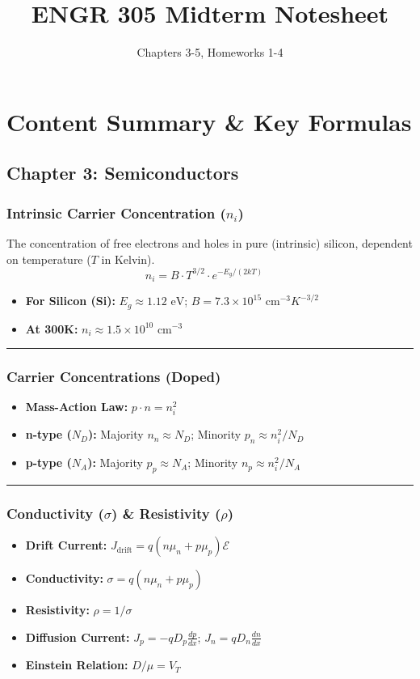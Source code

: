 \documentclass[10pt, letterpaper]{article}
\title{ENGR 305 Midterm Notesheet}
\author{Chapters 3-5, Homeworks 1-4}
\date{}
\begin{document}
\maketitle
\pagestyle{empty} %


\section*{Content Summary \& Key Formulas}

\subsection*{Chapter 3: Semiconductors}

\subsubsection*{Intrinsic Carrier Concentration ($n_i$)}
The concentration of free electrons and holes in pure (intrinsic) silicon, dependent on temperature ($T$ in Kelvin).
\[ n_i = B \cdot T^{3/2} \cdot e^{-E_g / (2 k T)} \quad \text{} \]
\begin{itemize}
    \item \textbf{For Silicon (Si):} $E_g \approx 1.12 \text{ eV}$; $B = 7.3 \times 10^{15} \text{ cm}^{-3}K^{-3/2}$
    \item \textbf{At 300K:} $n_i \approx 1.5 \times 10^{10} \text{ cm}^{-3}$
\end{itemize}

\hrule

\subsubsection*{Carrier Concentrations (Doped)}
\begin{itemize}
    \item \textbf{Mass-Action Law:} $p \cdot n = n_i^2$
    \item \textbf{n-type ($N_D$):} Majority $n_n \approx N_D$; Minority $p_n \approx n_i^2 / N_D$
    \item \textbf{p-type ($N_A$):} Majority $p_p \approx N_A$; Minority $n_p \approx n_i^2 / N_A$
\end{itemize}

\hrule

\subsubsection*{Conductivity ($\sigma$) \& Resistivity ($\rho$)}
\begin{itemize}
    \item \textbf{Drift Current:} $J_{\text{drift}} = q (n \mu_n + p \mu_p) \mathcal{E}$
    \item \textbf{Conductivity:} $\sigma = q (n \mu_n + p \mu_p)$
    \item \textbf{Resistivity:} $\rho = 1 / \sigma$
    \item \textbf{Diffusion Current:} $J_p = -q D_p \frac{dp}{dx}$; $J_n = q D_n \frac{dn}{dx}$
    \item \textbf{Einstein Relation:} $D / \mu = V_T$
\end{itemize}
\end{document}

